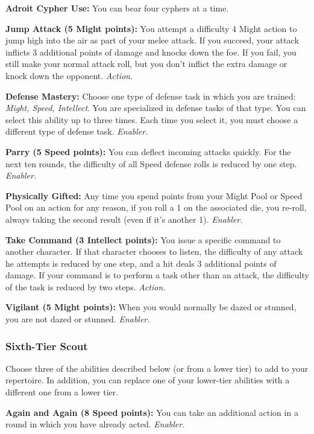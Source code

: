 \documentclass[a4paper,10pt,final,twocolumn,oneside]{book}
\newcommand{\itemAbility}[2]{\textcolor{25gray}{\textbullet\textbf{ #1:}}{ #2}\par}
\newcommand{\enabler}{\textit{ Enabler.}}
\newcommand{\action}{\textit{ Action.}}
\begin{document}
\itemAbility{Adroit Cypher Use}{You can bear four cyphers at a time.}

\itemAbility{Jump Attack (5 Might points)}{You attempt a difficulty 4 Might action to jump high into the air as part of your melee attack. If you succeed, your attack inflicts 3 additional points of damage and knocks down the foe. If you fail, you still make your normal attack roll, but you don’t inflict the extra damage or knock down the opponent.\action}

\itemAbility{Defense Mastery}{Choose one type of defense task in which you are trained: \textit{Might, Speed, Intellect}. You are specialized in defense tasks of that type. You can select this ability up to three times. Each time you select it, you must choose a different type of defense task.\enabler}

\itemAbility{Parry (5 Speed points)}{You can deflect incoming attacks quickly. For the next ten rounds, the difficulty of all Speed defense rolls is reduced by one step.\enabler}

\itemAbility{Physically Gifted}{Any time you spend points from your Might Pool or Speed Pool on an action for any reason, if you roll a 1 on the associated die, you re-roll, always taking the second result (even if it’s another 1).\enabler}

\itemAbility{Take Command (3 Intellect points)}{You issue a specific command to another character. If that character chooses to listen, the difficulty of any attack he attempts is reduced by one step, and a hit deals 3 additional points of damage. If your command is to perform a task other than an attack, the difficulty of the task is reduced by two steps.\action}

\itemAbility{Vigilant (5 Might points)}{When you would normally be dazed or stunned, you are not dazed or stunned.\enabler}


\subsubsection*{Sixth-Tier Scout}
\label{subsub:scoutSixthTier}

Choose three of the abilities described
below (or from a lower tier) to add to your
repertoire. In addition, you can replace one
of your lower-tier abilities with a different
one from a lower tier.

\itemAbility{Again and Again (8 Speed points)}{You can take an additional action in a round in which you have already acted.\enabler}
\end{document}
